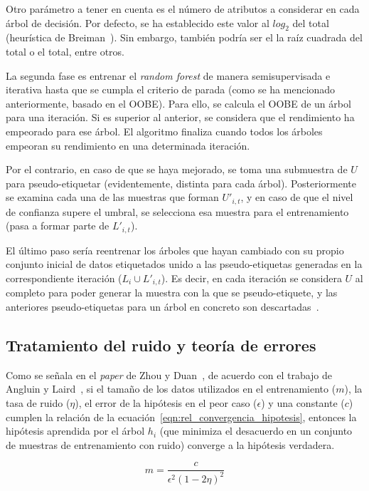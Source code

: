 Otro parámetro a tener en cuenta es el número de atributos a considerar en cada árbol de decisión. Por defecto, se ha establecido este valor al $log_{2}$ del total (heurística de Breiman~\cite{engelen2018thesis}). Sin embargo, también podría ser el la raíz cuadrada del total o el total, entre otros.

La segunda fase es entrenar el \textit{random forest} de manera semisupervisada e iterativa hasta que se cumpla el criterio de parada (como se ha mencionado anteriormente, basado en el OOBE). Para ello, se calcula el OOBE de un árbol para una iteración. Si es superior al anterior, se considera que el rendimiento ha empeorado para ese árbol. El algoritmo finaliza cuando todos los árboles empeoran su rendimiento en una determinada iteración.

Por el contrario, en caso de que se haya mejorado, se toma una submuestra de $U$ para pseudo-etiquetar (evidentemente, distinta para cada árbol). Posteriormente se examina cada una de las muestras que forman $U'_{i, t}$, y en caso de que el nivel de confianza supere el umbral, se selecciona esa muestra para el entrenamiento (pasa a formar parte de $L'_{i, t}$).

El último paso sería reentrenar los árboles que hayan cambiado con su propio conjunto inicial de datos etiquetados unido a las pseudo-etiquetas generadas en la correspondiente iteración ($L_{i}\cup L'_{i,t}$). Es decir, en cada iteración se considera $U$ al completo para poder generar la muestra con la que se pseudo-etiquete, y las anteriores pseudo-etiquetas para un árbol en concreto son descartadas~\cite{engelen2018thesis}.


\subsection{Tratamiento del ruido y teoría de errores}

Como se señala en el \textit{paper} de Zhou y Duan~\cite{zhou2021SemisupervisedRecommendationAttack}, de acuerdo con el trabajo de Angluin y Laird~\cite{noisyExamplesCoforest1988Dana}, si el tamaño de los datos utilizados en el entrenamiento ($m$), la tasa de ruido ($\eta$), el error de la hipótesis en el peor caso ($\epsilon$) y una constante ($c$) cumplen la relación de la ecuación~\ref{eqn:rel_convergencia_hipotesis}, entonces la hipótesis aprendida por el árbol $h_{i}$ (que minimiza el desacuerdo en un conjunto de muestras de entrenamiento con ruido) converge a la hipótesis verdadera.

\begin{equation}\label{eqn:rel_convergencia_hipotesis} m = \frac{c}{\epsilon^{2}(1-2\eta)^{2}} \end{equation} 

